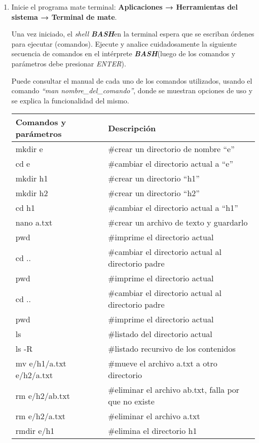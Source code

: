 \documentclass[12pt]{article}
\newcommand{\bash}{\textbf{\emph{BASH}}}
\begin{document}
\begin{enumerate}

    \item Inicie el programa mate terminal: \textbf{Aplicaciones →
        Herramientas del sistema → Terminal de mate}.

        Una vez iniciado, el \emph{shell} \bash en la terminal espera que se
        escriban órdenes para ejecutar (comandos). Ejecute y analice
        cuidadosamente la siguiente secuencia de comandos en el intérprete
        \bash (luego de los comandos y parámetros debe presionar
        \emph{ENTER}).

        Puede consultar el manual de cada uno de los comandos utilizados,
        usando el comando \emph{``man nombre\_del\_comando''}, donde se
        muestran opciones de uso y se explica la funcionalidad del mismo.

\begin{center}

    \begin{tabular}[t]{l l }
    \hline
        \textbf{Comandos y parámetros} & \textbf{Descripción} \\
    \hline
    \hline
        mkdir e &  \#crear un directorio de nombre ``e'' \\
        cd e &  \#cambiar el directorio actual a ``e'' \\
        mkdir h1 &  \#crear un directorio ``h1'' \\
        mkdir h2 &  \#crear un directorio ``h2'' \\
        cd h1 &  \#cambiar el directorio actual a ``h1'' \\
        nano a.txt &  \#crear un archivo de texto y guardarlo \\
        pwd &  \#imprime el directorio actual \\
        cd .. &  \#cambiar el directorio actual al directorio padre \\
        pwd &  \#imprime el directorio actual \\
        cd .. &  \#cambiar el directorio actual al directorio padre \\
        pwd &  \#imprime el directorio actual \\
        ls &  \#listado del directorio actual \\
        ls -R &  \#listado recursivo de los contenidos \\
        mv e/h1/a.txt e/h2/a.txt &  \#mueve el archivo a.txt a otro directorio \\
        rm e/h2/ab.txt &  \#eliminar el archivo ab.txt, falla por que no
        existe\\
        rm e/h2/a.txt &  \#eliminar el archivo a.txt \\
        rmdir e/h1 &  \#elimina el directorio h1 \\
    \hline
    \end{tabular}


\end{center}
\end{enumerate}
\end{document}
